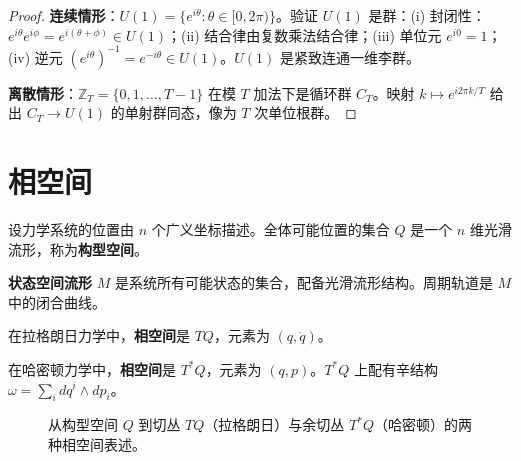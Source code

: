 \begin{proof}
\textbf{连续情形}：$U(1) = \{e^{i\theta} : \theta \in [0, 2\pi)\}$。验证 $U(1)$ 是群：(i) 封闭性：$e^{i\theta}e^{i\phi} = e^{i(\theta+\phi)} \in U(1)$；(ii) 结合律由复数乘法结合律；(iii) 单位元 $e^{i0} = 1$；(iv) 逆元 $(e^{i\theta})^{-1} = e^{-i\theta} \in U(1)$。$U(1)$ 是紧致连通一维李群。

\textbf{离散情形}：$\mathbb{Z}_T = \{0, 1, \dots, T-1\}$ 在模 $T$ 加法下是循环群 $C_T$。映射 $k \mapsto e^{i2\pi k/T}$ 给出 $C_T \to U(1)$ 的单射群同态，像为 $T$ 次单位根群。
\end{proof}

\section{相空间}

\begin{definition}[构型空间]\label{def:configuration_space}
设力学系统的位置由 $n$ 个广义坐标描述。全体可能位置的集合 $Q$ 是一个 $n$ 维光滑流形，称为\textbf{构型空间}。
\end{definition}

\begin{definition}[状态空间流形]\label{def:state_space_manifold}
\textbf{状态空间流形} $M$ 是系统所有可能状态的集合，配备光滑流形结构。周期轨道是 $M$ 中的闭合曲线。
\end{definition}

\begin{definition}\label{def:phase_space_tangent}
在拉格朗日力学中，\textbf{相空间}是 $TQ$，元素为 $(q, \dot{q})$。
\end{definition}

\begin{definition}\label{def:phase_space_cotangent}
在哈密顿力学中，\textbf{相空间}是 $T^*Q$，元素为 $(q, p)$。$T^*Q$ 上配有辛结构 $\omega = \sum_i dq^i \wedge dp_i$。
\end{definition}

\begin{figure}[htbp]
\centering
{}
\caption{从构型空间 $Q$ 到切丛 $TQ$（拉格朗日）与余切丛 $T^*Q$（哈密顿）的两种相空间表述。}
\label{fig:phase_space}
\end{figure}

